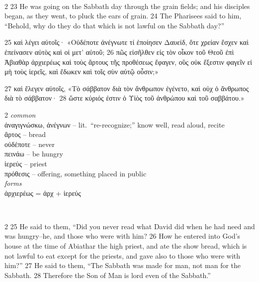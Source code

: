 \documentclass[10pt,a5paper,twoside,twocolumn]{book}
\newcommand*\cleartoleftpage{%
  \ifodd\value{page}\hbox{}\clearpage\fi
}
\newcommand{\separator}{\hspace{0.27\textwidth}\noindent\makebox[\linewidth]{\resizebox{0.3333\linewidth}{1pt}{$\bullet$}}\bigskip}
\newenvironment{facing}{\cleartoleftpage}{\clearpage\pagebreak}
\newenvironment{help}{\clearpage}{}
\newenvironment{helpsec}{\begin{minipage}[t]{\textwidth}\begin{multicols}{2}}{\end{multicols}\end{minipage}}
\newenvironment{vocab}{\begin{helpsec}}{\end{helpsec}}
\newenvironment{translation}{\separator\\\begin{helpsec}\footnotesize}{\end{helpsec}}
\begin{document}
\begin{facing}
\begin{help}
\begin{translation}
23 He was going on the Sabbath day through the grain fields; and his disciples began, as they went, to pluck the ears of grain. 24 The Pharisees said to him, ``Behold, why do they do that which is not lawful on the Sabbath day?'' 

\end{translation}
\end{help}
\end{facing}


\begin{facing}
25 καὶ λέγει αὐτοῖς· «Οὐδέποτε ἀνέγνωτε τί ἐποίησεν Δαυείδ, ὅτε χρείαν ἔσχεν καὶ ἐπείνασεν αὐτὸς καὶ οἱ μετ’ αὐτοῦ; 26 πῶς εἰσῆλθεν εἰς τὸν οἶκον τοῦ Θεοῦ ἐπὶ Ἀβιαθὰρ ἀρχιερέως καὶ τοὺς ἄρτους τῆς προθέσεως ἔφαγεν, οὓς οὐκ ἔξεστιν φαγεῖν εἰ μὴ τοὺς ἱερεῖς, καὶ ἔδωκεν καὶ τοῖς σὺν αὐτῷ οὖσιν;»

27 καὶ ἔλεγεν αὐτοῖς, «Τὸ σάββατον διὰ τὸν ἄνθρωπον ἐγένετο, καὶ οὐχ ὁ ἄνθρωπος διὰ τὸ σάββατον· 28 ὥστε κύριός ἐστιν ὁ Υἱὸς τοῦ ἀνθρώπου καὶ τοῦ σαββάτου.»

\begin{help}
\begin{vocab}
\emph{common}\\
ἀναγιγνώσκω, ἀνέγνων  -- lit.~``re-recognize;'' know well, read aloud, recite\\
ἄρτος -- bread\\
οὐδέποτε -- never\\
πεινάω -- be hungry\\
ἱερεύς -- priest\\
πρόθεσις -- offering, something placed in public\\

\emph{forms}\\
ἀρχιερέως = ἀρχ + ἱερεύς\\
\end{vocab}
\begin{translation}
 25 He said to them, ``Did you never read what David did when he had need and was hungry--he, and those who were with him? 26  How he entered into God's house at the time of Abiathar the high priest, and ate the show bread, which is not lawful to eat except for the priests, and gave also to those who were with him?''
27 He said to them, ``The Sabbath was made for man, not man for the Sabbath. 28  Therefore the Son of Man is lord even of the Sabbath.''
\end{translation}
\end{help}
\end{facing}
\end{document}
